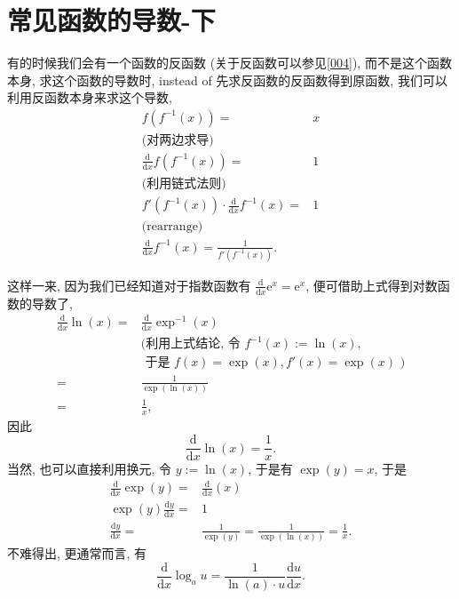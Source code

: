 \section{常见函数的导数-下}\label{014}

\begin{tcolorbox}[size=fbox, breakable, enhanced jigsaw, title={逆函数和导数}]

有的时候我们会有一个函数的反函数 (关于反函数可以参见\ref{004}),
而不是这个函数本身, 求这个函数的导数时, instead of
先求反函数的反函数得到原函数, 我们可以利用反函数本身来求这个导数,
\begin{align*}
f(f^{-1}(x))=&x\\
\text{(对两边求导)}\\
\frac{\mathrm{d}}{\mathrm{d}x}f(f^{-1}(x))=&1\\
\text{(利用链式法则)}\\
f'(f^{-1}(x))\cdot\frac{\mathrm{d}}{\mathrm{d}x}f^{-1}(x)=&1\\
\text{(rearrange)}\\
\boxed{\frac{\mathrm{d}}{\mathrm{d}x}f^{-1}(x)=\frac{1}{f'(f^{-1}(x))}}.
\end{align*}

\end{tcolorbox}

\begin{tcolorbox}[size=fbox, breakable, enhanced jigsaw, title={对数函数}]

这样一来, 因为我们已经知道对于指数函数有
$\frac{\mathrm{d}}{\mathrm{d}x}\mathrm{e}^x=\mathrm{e}^x$,
便可借助上式得到对数函数的导数了,
\begin{align*}
\frac{\mathrm{d}}{\mathrm{d}x}\ln(x)=&\frac{\mathrm{d}}{\mathrm{d}x}\exp^{-1}(x)\\
&\text{(利用上式结论, 令 }f^{-1}(x):=\ln(x),\\
&\text{ 于是 }f(x)=\exp(x), f'(x)=\exp(x)\text{ )}\\
=&\frac{1}{\exp(\ln(x))}\\
=&\frac{1}{x},
\end{align*}
因此 \begin{equation*}
\boxed{\frac{\mathrm{d}}{\mathrm{d}x}\ln(x)=\frac{1}{x}}.
\end{equation*} 当然, 也可以直接利用换元, 令 $y:=\ln(x)$, 于是有 $\exp(y)=x$,
于是
\begin{align*}
\frac{\mathrm{d}}{\mathrm{d}x}\exp(y)=&\frac{\mathrm{d}}{\mathrm{d}x}(x)\\
\exp(y)\frac{\mathrm{d}y}{\mathrm{d}x}=&1\\
\frac{\mathrm{d}y}{\mathrm{d}x}=&\frac{1}{\exp(y)}=\frac{1}{\exp(\ln(x))}=\frac{1}{x}.
\end{align*}
不难得出, 更通常而言, 有 \begin{equation*}
\boxed{\frac{\mathrm{d}}{\mathrm{d}x}\log_au=\frac{1}{\ln(a)\cdot u}\frac{\mathrm{d}u}{\mathrm{d}x}}.
\end{equation*}

\end{tcolorbox}

